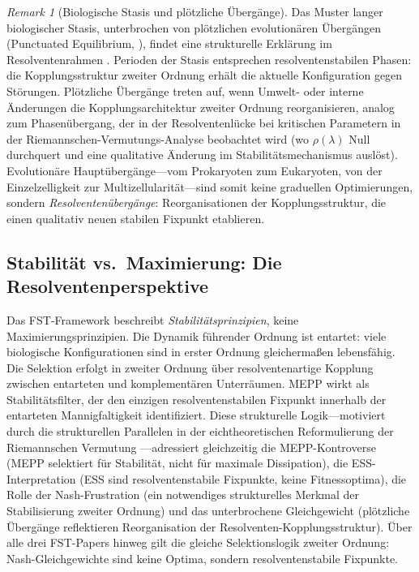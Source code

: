 \documentclass[12pt,a4paper]{article}
\theoremstyle{remark}
\newtheorem{remark}{Remark}
\begin{document}
\begin{remark}[Biologische Stasis und pl\"otzliche \"Uberg\"ange]
\label{rem:punctuated-equilibrium}
Das Muster langer biologischer Stasis, unterbrochen von pl\"otzlichen evolution\"aren \"Uberg\"angen (Punctuated Equilibrium, \citealp{KauffmanOrigins}), findet eine strukturelle Erkl\"arung im Resolventenrahmen \citep{FST-RH2}. Perioden der Stasis entsprechen resolventenstabilen Phasen: die Kopplungsstruktur zweiter Ordnung erh\"alt die aktuelle Konfiguration gegen St\"orungen. Pl\"otzliche \"Uberg\"ange treten auf, wenn Umwelt- oder interne \"Anderungen die Kopplungsarchitektur zweiter Ordnung reorganisieren, analog zum Phasen\"ubergang, der in der Resolventenl\"ucke bei kritischen Parametern in der Riemannschen-Vermutungs-Analyse beobachtet wird (wo $\rho(\lambda)$ Null durchquert und eine qualitative \"Anderung im Stabilit\"atsmechanismus ausl\"ost). Evolution\"are Haupt\"uberg\"ange---vom Prokaryoten zum Eukaryoten, von der Einzelzelligkeit zur Multizellularit\"at---sind somit keine graduellen Optimierungen, sondern \emph{Resolventen\"uberg\"ange}: Reorganisationen der Kopplungsstruktur, die einen qualitativ neuen stabilen Fixpunkt etablieren.
\end{remark}

\subsection{Stabilit\"at vs.\ Maximierung: Die Resolventenperspektive}

Das FST-Framework beschreibt \emph{Stabilit\"atsprinzipien}, keine Maximierungsprinzipien. Die Dynamik f\"uhrender Ordnung ist entartet: viele biologische Konfigurationen sind in erster Ordnung gleicherma\ss{}en lebensfähig. Die Selektion erfolgt in zweiter Ordnung \"uber resolventenartige Kopplung zwischen entarteten und komplement\"aren Unterr\"aumen. MEPP wirkt als Stabilit\"atsfilter, der den einzigen resolventenstabilen Fixpunkt innerhalb der entarteten Mannigfaltigkeit identifiziert. Diese strukturelle Logik---motiviert durch die strukturellen Parallelen in der eichtheoretischen Reformulierung der Riemannschen Vermutung \citep{FST-RH2}---adressiert gleichzeitig die MEPP-Kontroverse (MEPP selektiert f\"ur Stabilit\"at, nicht f\"ur maximale Dissipation), die ESS-Interpretation (ESS sind resolventenstabile Fixpunkte, keine Fitnessoptima), die Rolle der Nash-Frustration (ein notwendiges strukturelles Merkmal der Stabilisierung zweiter Ordnung) und das unterbrochene Gleichgewicht (pl\"otzliche \"Uberg\"ange reflektieren Reorganisation der Resolventen-Kopplungsstruktur). \"Uber alle drei FST-Papers hinweg gilt die gleiche Selektionslogik zweiter Ordnung: Nash-Gleichgewichte sind keine Optima, sondern resolventenstabile Fixpunkte.
\end{document}
